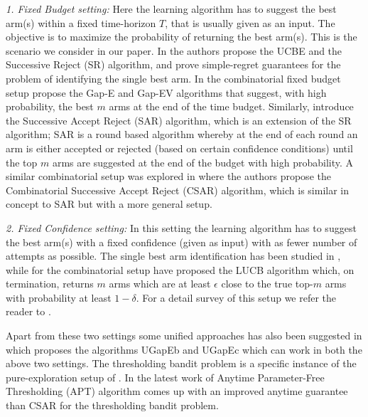 	\emph{1. Fixed Budget setting:} Here the learning algorithm has to suggest the best arm(s) within a fixed time-horizon $T$, that is usually given as an input. The objective is to maximize the probability of returning the best arm(s).  This is the scenario we consider in our paper. In \cite{audibert2010best} the authors propose the  UCBE and the Successive Reject (SR) algorithm, and prove simple-regret guarantees for the problem of identifying the single best arm.  In the combinatorial fixed budget setup \cite{gabillon2011multi} propose the Gap-E and Gap-EV algorithms that suggest, with high probability, the best $m$ 
	 arms at the end of the time budget. Similarly, \cite{bubeck2013multiple} introduce the  Successive Accept Reject (SAR) algorithm, which is an extension of the SR algorithm; SAR is a round based algorithm whereby at the end of each round an arm is either accepted or rejected (based on certain confidence conditions) until the top $m$ arms are suggested at the end of the budget with high probability. A similar combinatorial setup was explored in \cite{chen2014combinatorial} where the authors propose the Combinatorial Successive Accept Reject (CSAR) algorithm, which is similar in concept to SAR but with a more general setup. 

	\emph{2. Fixed Confidence setting:} In this setting the learning algorithm has to suggest the best arm(s) with a fixed confidence (given as input) with as fewer number of attempts as possible. The single best arm identification has been studied in \cite{even2006action}, while for the combinatorial setup \cite{kalyanakrishnan2012pac} have proposed the LUCB algorithm which, on termination, returns  $m$ arms which are at least $\epsilon$ close to the true top-$m$ arms with probability at least $1-\delta$. For a detail survey of this setup we refer the reader to \cite{jamieson2014best}. 

Apart from these two settings some unified approaches has also been suggested in \cite{gabillon2012best} which proposes the algorithms UGapEb and UGapEc which can work in both the above two settings. The thresholding bandit problem is a specific instance of the pure-exploration setup of \cite{chen2014combinatorial}. In the latest work of \cite{locatelli2016optimal} Anytime Parameter-Free Thresholding (APT) algorithm comes up with an improved anytime guarantee than CSAR for the thresholding bandit problem.	
	
